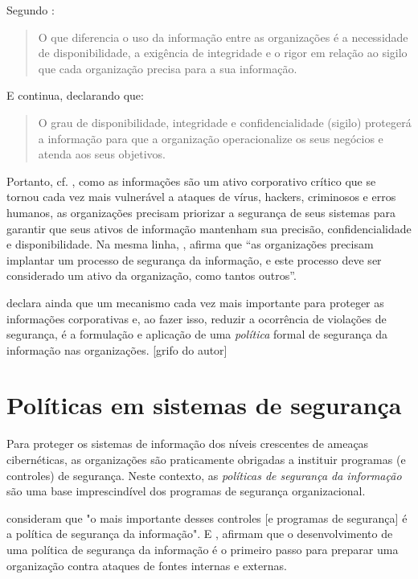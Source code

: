 Segundo \cite[p. 2]{fontes_politicas}:

\begin{quote}
	O que diferencia o uso da informação entre as organizações é a necessidade de disponibilidade, a exigência de integridade e o rigor em relação ao sigilo que cada organização precisa para a sua informação.
\end{quote}

E continua, declarando que:
\begin{quote}
		O grau de disponibilidade, integridade e confidencialidade (sigilo) protegerá a informação para que a organização operacionalize os seus negócios e atenda aos seus objetivos. \cite[p. 2]{fontes_politicas}
\end{quote}

Portanto, cf. \cite{doherty_information_2005}, como as informações são um ativo corporativo crítico que se tornou cada vez mais vulnerável a ataques de vírus, hackers, criminosos e erros humanos, as organizações precisam priorizar a segurança de seus sistemas para garantir que seus ativos de informação mantenham sua precisão, confidencialidade e disponibilidade. Na mesma linha, \cite[p. 4]{fontes_politicas}, afirma que ``as organizações precisam implantar um processo de segurança da informação, e este processo deve ser considerado um ativo da organização, como tantos outros''.

\cite{doherty_information_2005} declara ainda que um mecanismo cada vez mais importante para proteger as informações corporativas e, ao fazer isso, reduzir a ocorrência de violações de segurança, é a formulação e aplicação de uma \textit{política} formal de segurança da informação nas organizações. [grifo do autor]

\section{Políticas em sistemas de segurança} \label{politicas_sistemas_seguranca}

Para proteger os sistemas de informação dos níveis crescentes de ameaças cibernéticas, as organizações são praticamente obrigadas a instituir programas (e controles) de segurança. Neste contexto, as \textit{políticas de segurança da informação} são uma base imprescindível dos programas de segurança organizacional. \cite{knapp_information_2009} \cite{simon_administrative_1997}

\cite[p. 402]{hone_information_2002} consideram que "o mais importante desses controles [e programas de segurança] é a política de segurança da informação". E \cite{whitman_information_2001}, afirmam que o desenvolvimento de uma política de segurança da informação é o primeiro passo para preparar uma organização contra ataques de fontes internas e externas.

